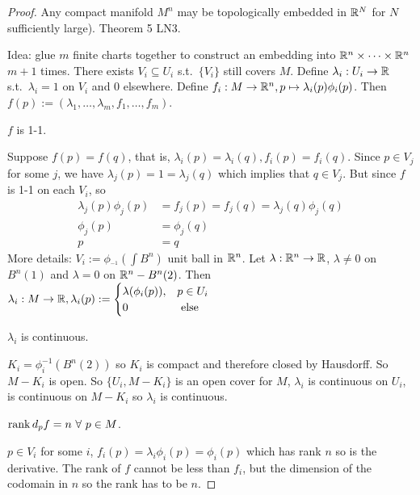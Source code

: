 \documentclass[12pt,class=article,crop=false]{standalone}
\begin{document}
\begin{proof}
Any compact manifold $ M^{n}$ may be topologically embedded in $ \mathbb{R}^{N}$ for $ N$ sufficiently large). Theorem 5 LN3.

Idea: glue $ m$ finite charts together to construct an embedding into $ \mathbb{R}^{n} \times  \cdots \times \mathbb{R}^{n}$ $ m+1$ times. There exists $ V_i \subseteq U_i$ s.t.\ $ \{V_i\} $ still covers $ M$. Define  $ \lambda_i: U_i \to \mathbb{R}$ s.t.\ $ \lambda_i=1$ on $ V_i$ and 0 elsewhere. Define $ f_i: M \to \mathbb{R}^{n}, p \mapsto \lambda_i(p) \phi_i(p)$. Then $ f(p):=(\lambda_1,\ldots, \lambda_m,f_1,\ldots,f_m)$.

\begin{claim}
$ f$ is 1-1.
\end{claim}
Suppose $ f(p) = f(q)$, that is,  $ \lambda_i(p)= \lambda_i(q), f_i(p) = f_i(q)$. Since $ p \in V_j$ for some $ j$, we have  $ \lambda_j(p) = 1 = \lambda_j(q)$ which implies that $ q \in V_j$. But since $ f$ is 1-1 on each  $ V_i$, so
\begin{align*}
	\lambda_j(p) \phi_j(p) &= f_j(p) = f_j(q) = \lambda_j(q) \phi_j(q) \\
	\phi_j(p) &= \phi_j(q) \\
	p&= q 
\end{align*}
More details: $ V_i:= \phi_^{-1} (\int B^{n})$ unit ball in $ \mathbb{R}^{n}$. Let $ \lambda: \mathbb{R}^{n} \to \mathbb{R}$, $ \lambda \neq 0 $ on $ B^{n}(1)$ and $ \lambda=0$ on $ \mathbb{R}^{n} - B^{n}(2)$. Then $ \lambda_i: M \to \mathbb{R}, \lambda_i(p) := \begin{cases}
	\lambda(\phi_i(p)),& p \in U_i\\
	0 & \text{ else}\\ 
\end{cases}$ 
\begin{claim}
$ \lambda_i$ is continuous.
\end{claim}

$ K_i = \phi_i ^{-1}(B^{n}(2))$ so $ K_i$ is compact and therefore closed by Hausdorff. So $ M - K_i$ is open. So $ \{U_i,M - K_i\} $ is an open cover for $ M$,  $ \lambda_i$ is continuous on $ U_i$, is continuous on $ M - K_i$ so $ \lambda_i$ is continuous.

\begin{claim}
$ \operatorname{rank} d_pf =n \ \forall \ p \in M$.
\end{claim}

$ p \in V_i$ for some $ i$,  $ f_i(p) = \lambda_i \phi_i(p) = \phi_i(p)$ which has rank $ n$ so is the derivative. The rank of  $ f$ cannot be less than  $ f_i$, but the dimension of the codomain in $ n$ so the rank has to be  $ n$.


\end{proof}
\end{document}
